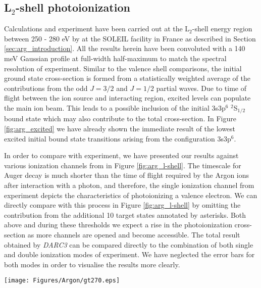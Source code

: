 \subsection{L$_{2}$-shell photoionization}\label{sec:arg_lshell}
Calculations and experiment have been carried out at the L$_{2}$-shell energy region between 250 - 280 eV by \citet{2012PhRvA..85d3408B} at the SOLEIL facility in France as described in Section \ref{sec:arg_introduction}. All the results herein have been convoluted with a 140 meV Gaussian profile at full-width half-maximum to match the spectral resolution of experiment. Similar to the valence shell comparisons, the initial ground state cross-section is formed from a statistically weighted average of the contributions from the odd $J=3/2$ and $J=1/2$ partial waves. Due to time of flight between the ion source and interacting region, excited levels can populate the main ion beam. This leads to a possible inclusion of the initial 3s3p$^6$ $^2$S$_{1/2}$ bound state which may also contribute to the total cross-section. In Figure \ref{fig:arg_excited} we have already shown the immediate result of the lowest excited initial bound state transitions arising from the configuration 3s3p$^6$.

In order to compare with experiment, we have presented our results against various ionization channels from \citet{2012PhRvA..85d3408B} in Figure \ref{fig:arg_l-shell}. The timescale for Auger decay is much shorter than the time of flight required by the Argon ions after interaction with a photon, and therefore, the single ionization channel from experiment depicts the characteristics of photoionizing a valence electron. We can directly compare with this process in Figure \ref{fig:arg_l-shell} by omitting the contribution from the additional 10 target states annotated by asterisks. Both above and during these thresholds we expect a rise in the photoionization cross-section as more channels are opened and become accessible. The total result obtained by \textit{DARC3} can be compared directly to the combination of both single and double ionization modes of experiment. We have neglected the error bars for both modes in order to visualise the results more clearly.

%
\begin{sidewaysfigure}
\centering
\texttt{[image: Figures/Argon/gt270.eps]}
\caption{The photoionization cross-section is presented against the photon energy in eV above 261.2 eV. The solid black line represents our current \textit{DARC3} model convoluted at 140 meV full-width half-maximum and the dashed black line is the contribution to the cross-section from valence shell photoionization of the 3s and 3p. The blue circles are experimental values of \citet{2012PhRvA..85d3408B} for the single ionization channel and pink circles represent the total contribution. \label{fig:arg_l-shell}}
\end{sidewaysfigure}
%

